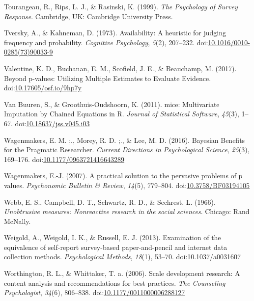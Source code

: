 \documentclass[english,man, mask]{apa6}
\theoremstyle{definition}
\theoremstyle{definition}
\theoremstyle{definition}
\theoremstyle{remark}
\begin{document}
\hypertarget{ref-Tourangeau1999}{}
Tourangeau, R., Rips, L. J., \& Rasinski, K. (1999). \emph{The
Psychology of Survey Response}. Cambridge, UK: Cambridge University
Press.

\hypertarget{ref-Tversky1973}{}
Tversky, A., \& Kahneman, D. (1973). Availability: A heuristic for
judging frequency and probability. \emph{Cognitive Psychology},
\emph{5}(2), 207--232.
doi:\href{https://doi.org/10.1016/0010-0285(73)90033-9}{10.1016/0010-0285(73)90033-9}

\hypertarget{ref-Valentine2017}{}
Valentine, K. D., Buchanan, E. M., Scofield, J. E., \& Beauchamp, M.
(2017). Beyond p-values: Utilizing Multiple Estimates to Evaluate
Evidence.
doi:\href{https://doi.org/10.17605/osf.io/9hp7y}{10.17605/osf.io/9hp7y}

\hypertarget{ref-VanBuuren2011}{}
Van Buuren, S., \& Groothuis-Oudshoorn, K. (2011). mice: Multivariate
Imputation by Chained Equations in R. \emph{Journal of Statistical
Software}, \emph{45}(3), 1--67.
doi:\href{https://doi.org/10.18637/jss.v045.i03}{10.18637/jss.v045.i03}

\hypertarget{ref-Wagenmakers2016}{}
Wagenmakers, E. M. ;., Morey, R. D. ;., \& Lee, M. D. (2016). Bayesian
Benefits for the Pragmatic Researcher. \emph{Current Directions in
Psychological Science}, \emph{25}(3), 169--176.
doi:\href{https://doi.org/10.1177/0963721416643289}{10.1177/0963721416643289}

\hypertarget{ref-Wagenmakers2007}{}
Wagenmakers, E.-J. (2007). A practical solution to the pervasive
problems of p values. \emph{Psychonomic Bulletin \& Review},
\emph{14}(5), 779--804.
doi:\href{https://doi.org/10.3758/BF03194105}{10.3758/BF03194105}

\hypertarget{ref-Webb1966}{}
Webb, E. S., Campbell, D. T., Schwartz, R. D., \& Sechrest, L. (1966).
\emph{Unobtrusive measures: Nonreactive research in the social
sciences}. Chicago: Rand McNally.

\hypertarget{ref-Weigold2013}{}
Weigold, A., Weigold, I. K., \& Russell, E. J. (2013). Examination of
the equivalence of self-report survey-based paper-and-pencil and
internet data collection methods. \emph{Psychological Methods},
\emph{18}(1), 53--70.
doi:\href{https://doi.org/10.1037/a0031607}{10.1037/a0031607}

\hypertarget{ref-Worthington2006}{}
Worthington, R. L., \& Whittaker, T. a. (2006). Scale development
research: A content analysis and recommendations for best practices.
\emph{The Counseling Psychologist}, \emph{34}(6), 806--838.
doi:\href{https://doi.org/10.1177/0011000006288127}{10.1177/0011000006288127}
\end{document}
